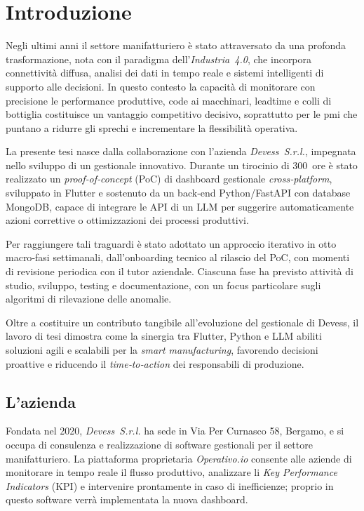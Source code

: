 \chapter{Introduzione}
\label{chap:introduzione}

Negli ultimi anni il settore manifatturiero è stato attraversato da una profonda trasformazione, nota con il paradigma dell’\textit{Industria~4.0}, che 
incorpora connettività diffusa, analisi dei dati in tempo reale e sistemi intelligenti di supporto alle decisioni. In questo contesto la capacità di monitorare con 
precisione le performance produttive, code ai macchinari, \gls{leadtime} e colli di bottiglia costituisce un vantaggio competitivo decisivo, soprattutto per le \gls{pmi} che puntano a ridurre gli sprechi e incrementare la flessibilità operativa.

La presente tesi nasce dalla collaborazione con l’azienda \textit{Devess~S.r.l.}, impegnata nello sviluppo di un gestionale innovativo. Durante un tirocinio di 300~ore è 
stato realizzato un \textit{proof‑of‑concept} (\gls{PoC}) di dashboard gestionale \textit{cross‑platform}, sviluppato in Flutter e sostenuto da un back‑end Python/FastAPI 
con database MongoDB, capace di integrare le \gls{API} di un \gls{LLM} per suggerire automaticamente azioni correttive o ottimizzazioni dei processi produttivi.

Per raggiungere tali traguardi è stato adottato un approccio iterativo in otto macro‑fasi settimanali, dall’onboarding tecnico al rilascio del PoC, con momenti di revisione 
periodica con il tutor aziendale. Ciascuna fase ha previsto attività di studio, sviluppo, testing e documentazione, con un focus particolare sugli algoritmi di rilevazione delle anomalie.

Oltre a costituire un contributo tangibile all’evoluzione del gestionale di Devess, il lavoro di tesi dimostra come la sinergia tra Flutter, Python e LLM abiliti soluzioni 
agili e scalabili per la \textit{smart manufacturing}, favorendo decisioni proattive e riducendo il \textit{time‑to‑action} dei responsabili di produzione.

\section{L'azienda}
Fondata nel 2020, \textit{Devess~S.r.l.} ha sede in Via Per Curnasco 58, Bergamo, e si occupa di consulenza e realizzazione di software gestionali per il settore manifatturiero. 
La piattaforma proprietaria \textit{Operativo.io} consente alle aziende di monitorare in tempo reale il flusso produttivo, analizzare li \textit{Key Performance Indicators} 
(\gls{KPI}) e intervenire prontamente in caso di inefficienze; proprio in questo software verrà implementata la nuova dashboard.

